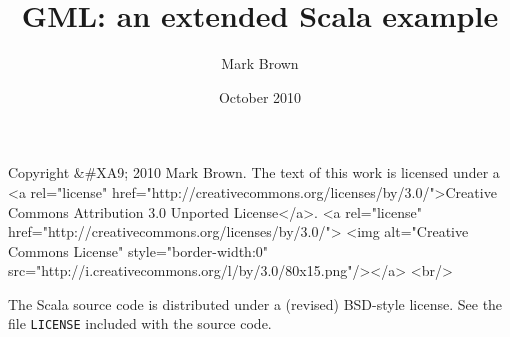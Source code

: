 \documentclass{article}
\title{GML: an extended Scala example}
\author{Mark Brown \\ \mailto{mark@csse.unimelb.edu.au}}
\date{October 2010}
\begin{document}
\maketitle

\begin{rawhtml}
Copyright &#XA9; 2010 Mark Brown.
The text of this work is licensed under a
<a rel="license" href="http://creativecommons.org/licenses/by/3.0/">Creative Commons Attribution 3.0 Unported License</a>.
<a rel="license" href="http://creativecommons.org/licenses/by/3.0/">
<img alt="Creative Commons License" style="border-width:0" src="http://i.creativecommons.org/l/by/3.0/80x15.png"/></a>
<br/>
\end{rawhtml}
The Scala source code is distributed under a (revised) BSD-style license.
See the file \verb!LICENSE! included with the source code.

\vspace{1ex}


\end{document}

